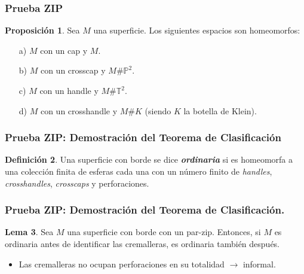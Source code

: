 \documentclass{beamer}
\newcommand{\Toro}{\mathbb{T}^2}
\newcommand{\Proyectivo}{\mathbb{P}^2}
\newcommand{\enfatiza}[1]{\textbf{\textit{#1}}}
\theoremstyle{definition}
\newtheorem{defin}{Definición}[section]
\newtheorem{prop}[defin]{Proposición}
\newtheorem{lema}[defin]{Lema}
\begin{document}
\begin{frame}
\frametitle{Prueba ZIP}
\begin{prop}

Sea $M$ una superficie. Los siguientes espacios son homeomorfos:
\begin{itemize}
\item[a)] $M$ con un cap y $M$.
\item[b)] $M$ con un crosscap y $M\# \Proyectivo$.
\item[c)] $M$ con un handle y $M\# \Toro$.
\item[d)] $M$ con un crosshandle y $M\# K$ (siendo $K$ la botella de Klein). 
\end{itemize}

\end{prop}
\end{frame}

\begin{frame}
\frametitle{Prueba ZIP: Demostración del Teorema de Clasificación}
\begin{defin}%
Una superficie con borde se dice \enfatiza{ordinaria} si es homeomorfa a una colección finita de esferas cada una con un número finito de \textit{handles}, \textit{crosshandles}, \textit{crosscaps} y perforaciones.
\end{defin}
\end{frame}

\begin{frame}
\frametitle{Prueba ZIP: Demostración del Teorema de Clasificación.}
\begin{lema}%
Sea $M$ una superficie con borde con un par-zip. Entonces, si $M$ es ordinaria antes de identificar las cremalleras, es ordinaria también después.\label{lema:superficie_ordinaria}
\end{lema}
\begin{itemize}
\item Las cremalleras no ocupan perforaciones en su totalidad $\longrightarrow$ informal.
\end{itemize}


\end{frame}
\end{document}
